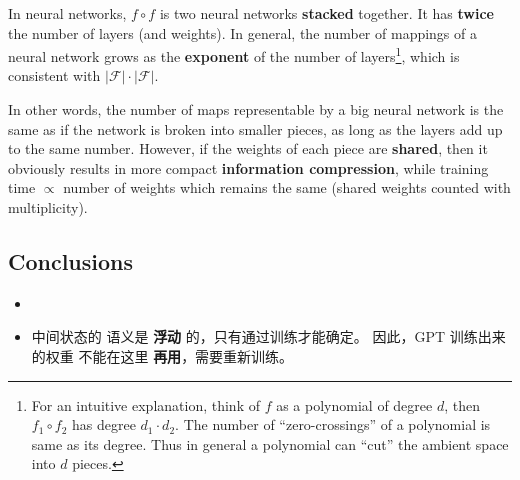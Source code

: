 \begin{preview}
\begin{minipage}{\textwidth}
In neural networks, $f \circ f$ is two neural networks \textbf{stacked} together.  It has \textbf{twice} the number of layers (and weights).  In general, the number of mappings of a neural network grows as the \textbf{exponent} of the number of layers\footnote{For an intuitive explanation, think of $f$ as a polynomial of degree $d$, then $f_1 \circ f_2$ has degree $d_1 \cdot d_2$.  The number of ``zero-crossings'' of a polynomial is same as its degree.  Thus in general a polynomial can ``cut'' the ambient space into $d$ pieces.}, which is consistent with $|\mathcal{F}|\cdot|\mathcal{F}|$.

In other words, the number of maps representable by a big neural network is the same as if the network is broken into smaller pieces, as long as the layers add up to the same number.  However, if the weights of each piece are \textbf{shared}, then it obviously results in more compact \textbf{information compression}, while training time $\propto$ number of weights which remains the same (shared weights counted with multiplicity).

\subsection{Conclusions}

\begin{itemize}
	\item {}

	\item 中间状态的 语义是 \textbf{浮动} 的，只有通过训练才能确定。 因此，GPT 训练出来的权重 不能在这里 \textbf{再用}，需要重新训练。

\end{itemize}

\end{minipage}
\end{preview}

